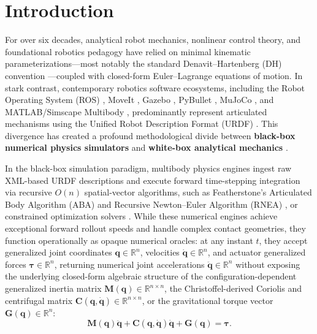 \documentclass[fleqn,10pt]{article}
\begin{document}
	\section*{Introduction}
	
	For over six decades, analytical robot mechanics, nonlinear control theory, and foundational robotics pedagogy have relied on minimal kinematic parameterizations---most notably the standard Denavit--Hartenberg (DH) convention \cite{denavit1955kinematic, craig2005introduction, spong2020robot, siciliano2010robotics}---coupled with closed-form Euler--Lagrange equations of motion. In stark contrast, contemporary robotics software ecosystems, including the Robot Operating System (ROS) \cite{quigley2009ros}, MoveIt \cite{chitta2012moveit}, Gazebo \cite{koenig2004design}, PyBullet \cite{coumans2016pybullet}, MuJoCo \cite{todorov2012mujoco}, and MATLAB/Simscape Multibody \cite{simscape2023multibody}, predominantly represent articulated mechanisms using the Unified Robot Description Format (URDF) \cite{tola2024understanding, chignoli2024urdf}. This divergence has created a profound methodological divide between \textbf{black-box numerical physics simulators} and \textbf{white-box analytical mechanics} \cite{iliuta2024digital, dimosthenopoulos2024digital}.
	
	In the black-box simulation paradigm, multibody physics engines ingest raw XML-based URDF descriptions and execute forward time-stepping integration via recursive $O(n)$ spatial-vector algorithms, such as Featherstone's Articulated Body Algorithm (ABA) and Recursive Newton--Euler Algorithm (RNEA) \cite{featherstone2014rigid, carpentier2019pinocchio}, or constrained optimization solvers \cite{todorov2012mujoco}. While these numerical engines achieve exceptional forward rollout speeds and handle complex contact geometries, they function operationally as opaque numerical oracles: at any instant $t$, they accept generalized joint coordinates $\bm{q} \in \mathbb{R}^n$, velocities $\dot{\bm{q}} \in \mathbb{R}^n$, and actuator generalized forces $\bm{\tau} \in \mathbb{R}^n$, returning numerical joint accelerations $\ddot{\bm{q}} \in \mathbb{R}^n$ without exposing the underlying closed-form algebraic structure of the configuration-dependent generalized inertia matrix $\bm{M}(\bm{q}) \in \mathbb{R}^{n \times n}$, the Christoffel-derived Coriolis and centrifugal matrix $\bm{C}(\bm{q},\dot{\bm{q}}) \in \mathbb{R}^{n \times n}$, or the gravitational torque vector $\bm{G}(\bm{q}) \in \mathbb{R}^n$:
	\begin{equation}
		\bm{M}(\bm{q})\ddot{\bm{q}} + \bm{C}(\bm{q},\dot{\bm{q}})\dot{\bm{q}} + \bm{G}(\bm{q}) = \bm{\tau}.
		\label{eq:euler_lagrange}
	\end{equation}
	
\end{document}
